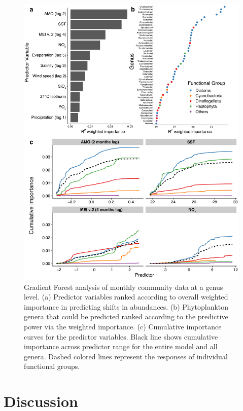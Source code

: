 \documentclass[draft]{agujournal2019}
\begin{document}
\begin{figure}
\noindent\includegraphics[width=\textwidth]{fig/Figure6_GF_output_FINAL_v2.pdf}
\caption{Gradient Forest analysis of monthly community data at a genus level. (a) Predictor variables ranked according to overall weighted importance in predicting shifts in abundances. (b) Phytoplankton genera that could be predicted ranked according to the predictive power via the weighted importance. (c) Cumulative importance curves for the predictor variables. Black line shows cumulative importance across predictor range for the entire model and all genera. Dashed colored lines represent the responses of individual functional groups.}
\label{fig:GF}
\end{figure}


\section{Discussion}
\end{document}
